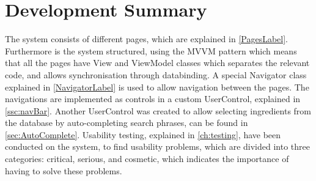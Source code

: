 \chapter{Development Summary}
The system consists of  different pages, which are explained in \cref{PagesLabel}. Furthermore is the system structured, using the MVVM pattern which means that all the pages have View and ViewModel classes which separates the relevant code, and allows synchronisation through databinding.
A special Navigator class explained in \cref{NavigatorLabel} is used to allow navigation between the pages. The navigations are implemented as controls in a custom UserControl, explained in \cref{ssc:navBar}. Another UserControl was created to allow selecting ingredients from the database by auto-completing search phrases, can be found in \cref{sec:AutoComplete}.
Usability testing, explained in \cref{ch:testing}, have been conducted on the system, to find usability problems, which are divided into three categories: critical, serious, and cosmetic, which indicates the importance of having to solve these problems.